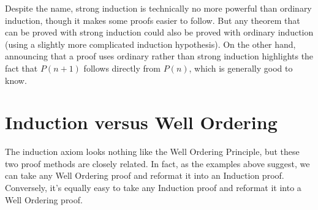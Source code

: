 Despite the name, strong induction is technically no more powerful than
ordinary induction, though it makes some proofs easier to follow.  But any
theorem that can be proved with strong induction could also be proved with
ordinary induction (using a slightly more complicated induction
hypothesis).  On the other hand, announcing that a proof uses ordinary
rather than strong induction highlights the fact that $P(n+1)$ follows
directly from $P(n)$, which is generally good to know.

\begin{problems}
\classproblems
{} %
\end{problems}


\section{Induction versus Well Ordering}\label{versusWO}

The induction axiom looks nothing like the Well Ordering Principle, but
these two proof methods are closely related.  In fact, as the examples
above suggest, we can take any Well Ordering proof and reformat it into an
Induction proof.  Conversely, it's equally easy to take any Induction
proof and reformat it into a Well Ordering proof.

\iffalse Here's how to reformat an induction proof and into a Well
Ordering proof : suppose that we have a proof by induction with
hypothesis $P(n)$.  Then we start a Well Ordering proof by assuming the
set of counterexamples to $P$ is nonempty.  Then by Well Ordering there is
a smallest counterexample, $s$, that is, a smallest $s$ such that $P(s)$
is false.

Now we use the proof of $P(0)$ that was part of the Induction proof to
conclude that $s$ must be greater than 0.  Also since $s$ is the smallest
counterexample, we can conclude that $P(s-1)$ must be true.  At this point
we reuse the proof of the inductive step in the Induction proof, which
shows that since $P(s-1)$ true, then $P(s)$ is also true.  This
contradicts the assumption that $P(s)$ is false, so we have the
contradiction needed to complete the Well Ordering Proof that $P(n)$ holds
for all $n \in \naturals$.
\fi

